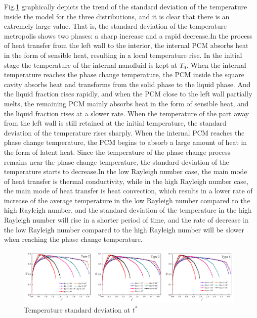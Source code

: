 \documentclass[preprint,12pt]{elsarticle}
\begin{document}
Fig.\ref{Fig_sigma-T} graphically depicts the trend of the standard deviation of the temperature inside the model for the three distributions, and it is clear that there is an extremely large value. That is, the standard deviation of the temperature metropolis shows two phases: a sharp increase and a rapid decrease.In the process of heat transfer from the left wall to the interior, the internal PCM absorbs heat in the form of sensible heat, resulting in a local temperature rise. In the initial stage the temperature of the internal nanofluid is kept at $ T_0 $. When the internal temperature reaches the phase change temperature, the PCM inside the square cavity absorbs heat and transforms from the solid phase to the liquid phase. And the liquid fraction rises rapidly, and when the PCM close to the left wall partially melts, the remaining PCM mainly absorbs heat in the form of sensible heat, and the liquid fraction rises at a slower rate.
When the temperature of the part away from the left wall is still retained at the initial temperature, the standard deviation of the temperature rises sharply. When the internal PCM reaches the phase change temperature, the PCM begins to absorb a large amount of heat in the form of latent heat. Since the temperature of the phase change process remains near the phase change temperature, the standard deviation of the temperature starts to decrease.In the low Rayleigh number case, the main mode of heat transfer is thermal conductivity, while in the high Rayleigh number case, the main mode of heat transfer is heat convection, which results in a lower rate of increase of the average temperature in the low Rayleigh number compared to the high Rayleigh number, and the standard deviation of the temperature in the high Rayleigh number will rise in a shorter period of time, and the rate of decrease in the low Rayleigh number compared to the high Rayleigh number will be slower when reaching the phase change temperature.
	\begin{figure}[H]
	\centering
	\includegraphics[scale=0.5]{Fig/sigma-T.png}
	\caption{Temperature standard deviation at $ t^* $ } 
	\label{Fig_sigma-T} 
\end{figure}
\end{document}
